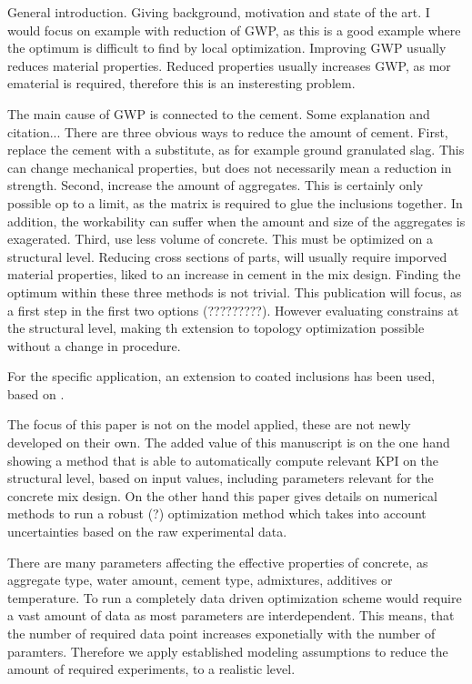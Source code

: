 General introduction.
Giving background, motivation and state of the art.
I would focus on example with reduction of GWP, as this is a good example where the optimum is difficult to find by local optimization.
Improving GWP usually reduces material properties.
Reduced properties usually increases GWP, as mor ematerial is required, therefore this is an insteresting problem.

The main cause of GWP is connected to the cement.
Some explanation and citation...
There are three obvious ways to reduce the amount of cement.
First, replace the cement with a substitute, as for example ground granulated slag.
This can change mechanical properties, but does not necessarily mean a reduction in strength.
Second, increase the amount of aggregates.
This is certainly only possible op to a limit, as the matrix is required to glue the inclusions together.
In addition, the workability can suffer when the amount and size of the aggregates is exagerated.
Third, use less volume of concrete.
This must be optimized on a structural level.
Reducing cross sections of parts, will usually require imporved material properties, liked to an increase in cement in the mix design.
Finding the optimum within these three methods is not trivial.
This publication will focus, as a first step in the first two options (?????????).
However evaluating constrains at the structural level, making th extension to topology optimization possible without a change in procedure.


For the specific application, an extension to coated inclusions has been used, based on \cite{her_1993_nlib}.



The focus of this paper is not on the model applied, these are not newly developed on their own.
The added value of this manuscript is on the one hand showing a method that is able to automatically compute relevant KPI on the structural level, based on input values, including parameters relevant for the concrete mix design.
On the other hand this paper gives details on numerical methods to run a robust (?) optimization method which takes into account uncertainties based on the raw experimental data.

There are many parameters affecting the effective properties of concrete, as aggregate type, water amount, cement type, admixtures, additives or temperature.
To run a completely data driven optimization scheme would require a vast amount of data as most parameters are interdependent.
This means, that the number of required data point increases exponetially with the number of paramters.
Therefore we apply established modeling assumptions to reduce the amount of required experiments, to a realistic level.







